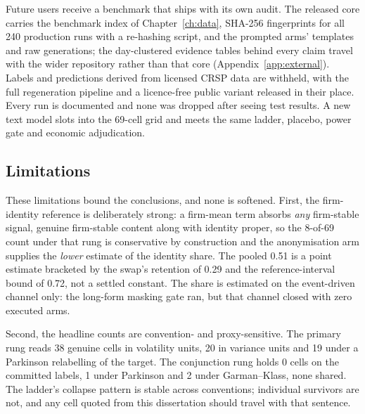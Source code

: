 Future users receive a benchmark that ships with its own audit. The released core carries the benchmark index of Chapter~\ref{ch:data}, SHA-256 fingerprints for all 240 production runs with a re-hashing script, and the prompted arms' templates and raw generations; the day-clustered evidence tables behind every claim travel with the wider repository rather than that core (Appendix~\ref{app:external}). %
Labels and predictions derived from licensed CRSP data are withheld, with the full regeneration pipeline and a licence-free public variant released in their place. %
Every run is documented and none was dropped after seeing test results. %
A new text model slots into the 69-cell grid and meets the same ladder, placebo, power gate and economic adjudication.

\subsection{Limitations}
\label{sec:conc-limitations}

These limitations bound the conclusions, and none is softened. First, the firm-identity reference is deliberately strong: a firm-mean term absorbs \emph{any} firm-stable signal, genuine firm-stable content along with identity proper, so the 8-of-69 count under that rung is conservative by construction and the anonymisation arm supplies the \emph{lower} estimate of the identity share. The pooled 0.51 is a point estimate bracketed by the swap's retention of 0.29 and the reference-interval bound of 0.72, not a settled constant. %
The share is estimated on the event-driven channel only: the long-form masking gate ran, but that channel closed with zero executed arms. %

Second, the headline counts are convention- and proxy-sensitive. The primary rung reads 38 genuine cells in volatility units, 20 in variance units and 19 under a Parkinson relabelling of the target. The conjunction rung holds 0 cells on the committed labels, 1 under Parkinson and 2 under Garman--Klass, none shared. %
The ladder's collapse pattern is stable across conventions; individual survivors are not, and any cell quoted from this dissertation should travel with that sentence.

